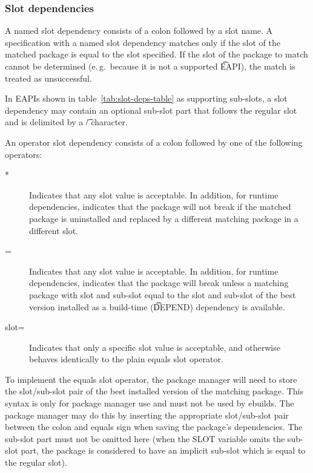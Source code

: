 \subsubsection{Slot dependencies}
\label{sec:slot-dep}

 A named slot dependency consists of a colon followed by a slot name. A
specification with a named slot dependency matches only if the slot of the matched package is equal
to the slot specified. If the slot of the package to match cannot be determined (e.\,g.\ because it
is not a supported \t{EAPI}), the match is treated as unsuccessful.

 In EAPIs shown in table~\ref{tab:slot-deps-table} as supporting sub-slots,
a slot dependency may contain an optional sub-slot part that follows the regular slot and is
delimited by a \t{/} character.

 An operator slot dependency consists of a colon followed by one of
the following operators:

\begin{description}
\item[*] Indicates that any slot value is acceptable. In addition, for runtime dependencies,
indicates that the package will not break if the matched package is uninstalled and replaced by
a different matching package in a different slot.
\item[=] Indicates that any slot value is acceptable. In addition, for runtime dependencies,
indicates that the package will break unless a matching package with slot and sub-slot equal to the
slot and sub-slot of the best version installed as a build-time (\t{DEPEND}) dependency is
available.
\item[slot=] Indicates that only a specific slot value is acceptable, and otherwise behaves
identically to the plain equals slot operator.
\end{description}

To implement the equals slot operator, the package manager will need to store the slot/sub-slot
pair of the best installed version of the matching package. This syntax is only for package manager
use and must not be used by ebuilds. The package manager may do this by inserting the appropriate
slot/sub-slot pair between the colon and equals sign when saving the package's dependencies. The
sub-slot part must not be omitted here (when the SLOT variable omits the sub-slot part, the package
is considered to have an implicit sub-slot which is equal to the regular slot).

